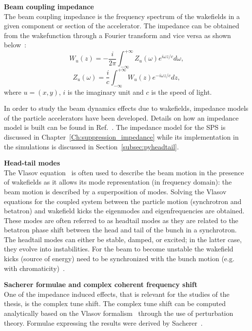 \textbf{Beam coupling impedance}\\
The beam coupling impedance is the frequency spectrum of the wakefields in a given component or section of the accelerator. The impedance can be obtained from the wakefunction through a Fourier transform and vice versa as shown below~\cite{Chao:collective}: %
\begin{equation}\label{eq:wakes_to_impedance}
    W_u(z) = - \frac{i}{ 2\pi} \int_{- \infty}^{+\infty} Z_u(\omega) e^{i \omega z/c} d\omega,
\end{equation}
\begin{equation}\label{eq:impedance_to_wakes}
    Z_u(\omega) = \frac{i}{c} \int_{- \infty}^{+\infty} W_u(z) e^{-i \omega z/c} dz,
\end{equation}
where $u=(x,y)$, $i$ is the imaginary unit and $c$ is the speed of light.

In order to study the beam dynamics effects due to wakefields, impedance models of the particle accelerators have been developed. Details on how an impedance model is built can be found in Ref.~\cite{benoit_ipac19_impedance}. The impedance model for the SPS is discussed in Chapter~\ref{Ch:suppression_impedance} while its implementation in the simulations is discussed in Section~\ref{subsec:pyheadtail}.

\textbf{Head-tail modes}\\
The Vlasov equation~\cite{Vlasov:426186} is often used to describe the beam motion in the presence of wakefields as it allows its mode representation (in frequency domain): the beam motion is described by a superposition of modes. %
Solving the Vlasov equations for the coupled system between the particle motion (synchrotron and betatron) and wakefield kicks the eigenmodes and eigenfrequencies are obtained. These modes are often referred to as headtail modes as they are related to the betatron phase shift between the head and tail of the bunch in a synchrotron. The headtail modes can either be stable, damped, or excited; in the latter case, they evolve into instabilities. For the beam to become unstable the wakefield kicks (source of energy) need to be synchronized with the bunch motion (e.g. with chromaticity)~\cite{instabilities_rumulo_li}.

\textbf{Sacherer formulae and complex coherent frequency shift}\\
One of the impedance induced effects, that is relevant for the studies of the thesis, is the complex tune shift. The complex tune shift can be computed analytically based on the Vlasov formalism~\cite{Vlasov:426186} through the use of perturbation theory. Formulae expressing the results were derived by Sacherer~\cite{Sacherer:322545, Sacherer:322645}. %

